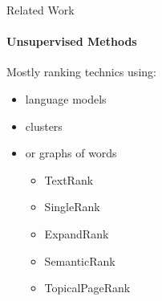   \begin{frame}{Related Work}
    \framesubtitle{Unsupervised Methods}

    Mostly ranking technics using:
    \begin{itemize}
      \item{language models~\cite{tomokiyo2003languagemodel}}
      \item{clusters~\cite{liu2009keycluster}}
      \item{or graphs of words}
      \begin{itemize}
        \item<2->{TextRank~\cite{mihalcea2004textrank}}
        \item<2->{SingleRank~\cite{wan2008expandrank}}
        \item<2->{ExpandRank~\cite{wan2008expandrank}}
        \item<2->{SemanticRank~\cite{tsatsaronis2010semanticrank}}
        \item<2->{TopicalPageRank~\cite{liu2010topicalpagerank}}
      \end{itemize}
    \end{itemize}
  \end{frame}

